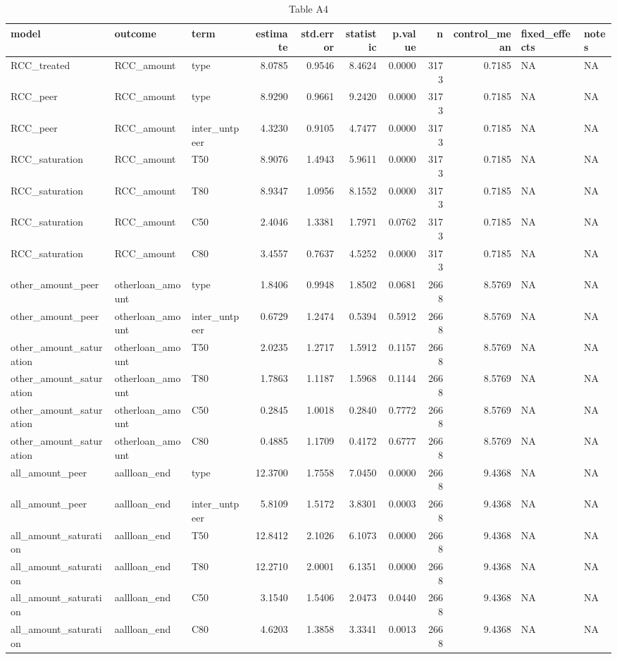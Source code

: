 \begin{table}

\caption{Table A4}
\centering
\begin{tabular}[t]{lllrrrrrrll}
\toprule
model & outcome & term & estimate & std.error & statistic & p.value & n & control\_mean & fixed\_effects & notes\\
\midrule
RCC\_treated & RCC\_amount & type & 8.0785 & 0.9546 & 8.4624 & 0.0000 & 3173 & 0.7185 & NA & NA\\
RCC\_peer & RCC\_amount & type & 8.9290 & 0.9661 & 9.2420 & 0.0000 & 3173 & 0.7185 & NA & NA\\
RCC\_peer & RCC\_amount & inter\_untpeer & 4.3230 & 0.9105 & 4.7477 & 0.0000 & 3173 & 0.7185 & NA & NA\\
RCC\_saturation & RCC\_amount & T50 & 8.9076 & 1.4943 & 5.9611 & 0.0000 & 3173 & 0.7185 & NA & NA\\
RCC\_saturation & RCC\_amount & T80 & 8.9347 & 1.0956 & 8.1552 & 0.0000 & 3173 & 0.7185 & NA & NA\\
\addlinespace
RCC\_saturation & RCC\_amount & C50 & 2.4046 & 1.3381 & 1.7971 & 0.0762 & 3173 & 0.7185 & NA & NA\\
RCC\_saturation & RCC\_amount & C80 & 3.4557 & 0.7637 & 4.5252 & 0.0000 & 3173 & 0.7185 & NA & NA\\
other\_amount\_peer & otherloan\_amount & type & 1.8406 & 0.9948 & 1.8502 & 0.0681 & 2668 & 8.5769 & NA & NA\\
other\_amount\_peer & otherloan\_amount & inter\_untpeer & 0.6729 & 1.2474 & 0.5394 & 0.5912 & 2668 & 8.5769 & NA & NA\\
other\_amount\_saturation & otherloan\_amount & T50 & 2.0235 & 1.2717 & 1.5912 & 0.1157 & 2668 & 8.5769 & NA & NA\\
\addlinespace
other\_amount\_saturation & otherloan\_amount & T80 & 1.7863 & 1.1187 & 1.5968 & 0.1144 & 2668 & 8.5769 & NA & NA\\
other\_amount\_saturation & otherloan\_amount & C50 & 0.2845 & 1.0018 & 0.2840 & 0.7772 & 2668 & 8.5769 & NA & NA\\
other\_amount\_saturation & otherloan\_amount & C80 & 0.4885 & 1.1709 & 0.4172 & 0.6777 & 2668 & 8.5769 & NA & NA\\
all\_amount\_peer & aallloan\_end & type & 12.3700 & 1.7558 & 7.0450 & 0.0000 & 2668 & 9.4368 & NA & NA\\
all\_amount\_peer & aallloan\_end & inter\_untpeer & 5.8109 & 1.5172 & 3.8301 & 0.0003 & 2668 & 9.4368 & NA & NA\\
\addlinespace
all\_amount\_saturation & aallloan\_end & T50 & 12.8412 & 2.1026 & 6.1073 & 0.0000 & 2668 & 9.4368 & NA & NA\\
all\_amount\_saturation & aallloan\_end & T80 & 12.2710 & 2.0001 & 6.1351 & 0.0000 & 2668 & 9.4368 & NA & NA\\
all\_amount\_saturation & aallloan\_end & C50 & 3.1540 & 1.5406 & 2.0473 & 0.0440 & 2668 & 9.4368 & NA & NA\\
all\_amount\_saturation & aallloan\_end & C80 & 4.6203 & 1.3858 & 3.3341 & 0.0013 & 2668 & 9.4368 & NA & NA\\
\bottomrule
\end{tabular}
\end{table}
